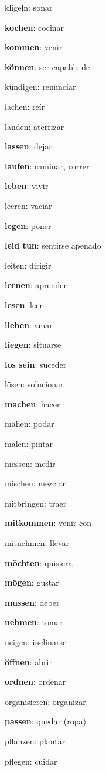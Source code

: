 \begin{multicols}{2}
\begin{myitemize}
\item kligeln: sonar
\item \textbf{kochen}: cocinar
\item \textbf{kommen}: venir
\item \textbf{können}: ser capable de
\item kündigen: renunciar
\item lachen: reír
\item landen: aterrizar
\item \textbf{lassen}: dejar
\item \textbf{laufen}: caminar, correr
\item \textbf{leben}: vivir
\item leeren: vaciar
\item \textbf{legen}: poner
\item \textbf{leid tun}: sentirse apenado
\item leiten: dirigir
\item \textbf{lernen}: aprender
\item \textbf{lesen}: leer
\item \textbf{lieben}: amar
\item \textbf{liegen}: situarse
\item \textbf{los sein}: suceder
\item lösen: solucionar
\item \textbf{machen}: hacer
\item mähen: podar
\item malen: pintar
\item messen: medir
\item mischen: mezclar
\item mitbringen: traer
\item \textbf{mitkommen}: venir con
\item mitnehmen: llevar
\item \textbf{möchten}: quisiera
\item \textbf{mögen}: gustar
\item \textbf{mussen}: deber
\item \textbf{nehmen}: tomar
\item neigen: inclinarse
\item \textbf{öffnen}: abrir
\item \textbf{ordnen}: ordenar
\item organisieren: organizar
\item \textbf{passen}: quedar (ropa)
\item pflanzen: plantar
\item pflegen: cuidar

\end{myitemize}
\end{multicols}
